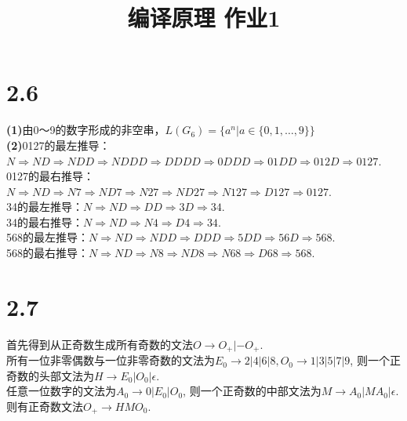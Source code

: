 \documentclass{article}
\title{编译原理 作业1}
\author{}
\date{}
\begin{document}
\section*{2.6}
\noindent 
\textbf{(1)}由0～9的数字形成的非空串，$L(G_6)=\{a^n|a\in\{0,1,\dots,9\}\}$\\
\textbf{(2)}0127的最左推导：$N\Rightarrow ND\Rightarrow NDD\Rightarrow NDDD\Rightarrow DDDD\Rightarrow 0DDD\Rightarrow
01DD\Rightarrow 012D\Rightarrow 0127$.\\
0127的最右推导：$N\Rightarrow ND \Rightarrow N7 \Rightarrow ND7 \Rightarrow N27 \Rightarrow ND27 \Rightarrow N127
\Rightarrow D127 \Rightarrow 0127$.\\
34的最左推导：$N\Rightarrow ND \Rightarrow DD\Rightarrow 3D \Rightarrow 34$.\\
34的最右推导：$N\Rightarrow ND \Rightarrow N4 \Rightarrow D4 \Rightarrow 34$.\\
568的最左推导：$N\Rightarrow ND\Rightarrow NDD\Rightarrow DDD\Rightarrow 5DD\Rightarrow 56D\Rightarrow 568$.\\
568的最右推导：$N\Rightarrow ND\Rightarrow N8\Rightarrow ND8\Rightarrow N68 \Rightarrow D68\Rightarrow 568$.
\section*{2.7}
\noindent 
首先得到从正奇数生成所有奇数的文法$O\rightarrow O_{+}|-O_{+}$.\\
所有一位非零偶数与一位非零奇数的文法为$E_0\rightarrow 2|4|6|8,O_0\rightarrow 1|3|5|7|9$,
则一个正奇数的头部文法为$H\rightarrow E_0|O_0|\epsilon$.\\
任意一位数字的文法为$A_0\rightarrow 0|E_0|O_0$,
则一个正奇数的中部文法为$M\rightarrow A_0|MA_0|\epsilon$.\\
则有正奇数文法$O_{+}\rightarrow HMO_0$.
\end{document}
